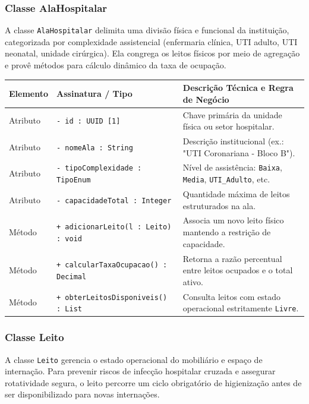 \subsubsection{Classe AlaHospitalar}
A classe \texttt{AlaHospitalar} delimita uma divisão física e funcional da instituição, categorizada por complexidade assistencial (enfermaria clínica, UTI adulto, UTI neonatal, unidade cirúrgica). Ela congrega os leitos físicos por meio de agregação e provê métodos para cálculo dinâmico da taxa de ocupação.

\begingroup
\small
\noindent\begin{tabularx}{\linewidth}{l >{\raggedright\arraybackslash}p{5.7cm} >{\raggedright\arraybackslash}X}
\toprule
\textbf{Elemento} & \textbf{Assinatura / Tipo} & \textbf{Descrição Técnica e Regra de Negócio} \\
\midrule
Atributo & \texttt{- id : UUID [1]} & Chave primária da unidade física ou setor hospitalar. \\
Atributo & \texttt{- nomeAla : String} & Descrição institucional (ex.: "UTI Coronariana - Bloco B"). \\
Atributo & \texttt{- tipoComplexidade : TipoEnum} & Nível de assistência: \texttt{Baixa}, \texttt{Media}, \texttt{UTI\_Adulto}, etc. \\
Atributo & \texttt{- capacidadeTotal : Integer} & Quantidade máxima de leitos estruturados na ala. \\
\midrule
Método & \texttt{+ adicionarLeito(l : Leito) : void} & Associa um novo leito físico mantendo a restrição de capacidade. \\
Método & \texttt{+ calcularTaxaOcupacao() : Decimal} & Retorna a razão percentual entre leitos ocupados e o total ativo. \\
Método & \texttt{+ obterLeitosDisponiveis() : List} & Consulta leitos com estado operacional estritamente \texttt{Livre}. \\
\bottomrule
\end{tabularx}
\endgroup

\subsubsection{Classe Leito}
A classe \texttt{Leito} gerencia o estado operacional do mobiliário e espaço de internação. Para prevenir riscos de infecção hospitalar cruzada e assegurar rotatividade segura, o leito percorre um ciclo obrigatório de higienização antes de ser disponibilizado para novas internações.

